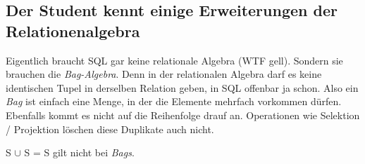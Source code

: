 \subsection{Der Student kennt einige Erweiterungen der Relationenalgebra}
Eigentlich braucht SQL gar keine relationale Algebra (WTF gell). Sondern sie brauchen die \emph{Bag-Algebra}. Denn in der relationalen Algebra darf es keine identischen Tupel in derselben Relation geben, in SQL offenbar ja schon. Also ein \emph{Bag} ist einfach eine Menge, in der die Elemente mehrfach vorkommen dürfen. Ebenfalls kommt es nicht auf die Reihenfolge drauf an. Operationen wie Selektion / Projektion löschen diese Duplikate auch nicht.

S \(\cup\) S = S gilt nicht bei \emph{Bags}.